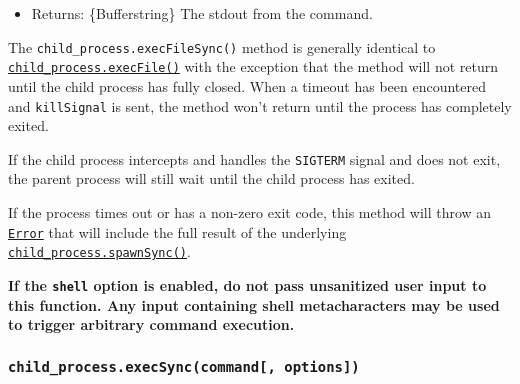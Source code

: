 \begin{itemize}
\begin{itemize}
    and outputs. \textbf{Default:}
    \texttt{\textquotesingle{}buffer\textquotesingle{}}.
  \item
    \texttt{windowsHide} \{boolean\} Hide the subprocess console window
    that would normally be created on Windows systems. \textbf{Default:}
    \texttt{false}.
  \item
    \texttt{shell} \{boolean\textbar string\} If \texttt{true}, runs
    \texttt{command} inside of a shell. Uses
    \texttt{\textquotesingle{}/bin/sh\textquotesingle{}} on Unix, and
    \texttt{process.env.ComSpec} on Windows. A different shell can be
    specified as a string. See \hyperref[shell-requirements]{Shell
    requirements} and \hyperref[default-windows-shell]{Default Windows
    shell}. \textbf{Default:} \texttt{false} (no shell).
  \end{itemize}
\item
  Returns: \{Buffer\textbar string\} The stdout from the command.
\end{itemize}

The \texttt{child\_process.execFileSync()} method is generally identical
to
\hyperref[child_processexecfilefile-args-options-callback]{\texttt{child\_process.execFile()}}
with the exception that the method will not return until the child
process has fully closed. When a timeout has been encountered and
\texttt{killSignal} is sent, the method won't return until the process
has completely exited.

If the child process intercepts and handles the \texttt{SIGTERM} signal
and does not exit, the parent process will still wait until the child
process has exited.

If the process times out or has a non-zero exit code, this method will
throw an \href{errors.md\#class-error}{\texttt{Error}} that will include
the full result of the underlying
\hyperref[child_processspawnsynccommand-args-options]{\texttt{child\_process.spawnSync()}}.

\textbf{If the \texttt{shell} option is enabled, do not pass unsanitized
user input to this function. Any input containing shell metacharacters
may be used to trigger arbitrary command execution.}

\subsubsection{\texorpdfstring{\texttt{child\_process.execSync(command{[},\ options{]})}}{child\_process.execSync(command{[}, options{]})}}\label{child_process.execsynccommand-options}

